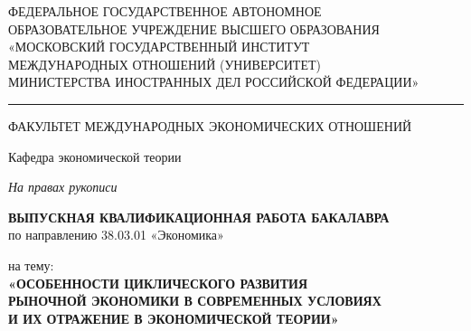 \thispagestyle{empty}


\vspace{0pt plus2fill} %
\begin{center}
	ФЕДЕРАЛЬНОЕ ГОСУДАРСТВЕННОЕ АВТОНОМНОЕ \\
    ОБРАЗОВАТЕЛЬНОЕ УЧРЕЖДЕНИЕ ВЫСШЕГО ОБРАЗОВАНИЯ \\
    «МОСКОВСКИЙ ГОСУДАРСТВЕННЫЙ ИНСТИТУТ \\
    МЕЖДУНАРОДНЫХ ОТНОШЕНИЙ (УНИВЕРСИТЕТ) \\
    МИНИСТЕРСТВА ИНОСТРАННЫХ ДЕЛ РОССИЙСКОЙ ФЕДЕРАЦИИ»
\rule{\textwidth}{0.4pt}
\end{center}

\begin{center}
    ФАКУЛЬТЕТ МЕЖДУНАРОДНЫХ ЭКОНОМИЧЕСКИХ ОТНОШЕНИЙ
\end{center}

\begin{center}
    Кафедра экономической теории
\end{center}

\vspace{2pt} %

\begin{flushright}
   \itshape  На правах рукописи
\end{flushright}

\vspace{0pt plus2fill} %

\begin{center}
    \textbf{ВЫПУСКНАЯ КВАЛИФИКАЦИОННАЯ РАБОТА БАКАЛАВРА} \\
    по направлению 38.03.01 «Экономика»
\end{center}

\begin{center}
    на тему: \\
    \textbf{«ОСОБЕННОСТИ ЦИКЛИЧЕСКОГО РАЗВИТИЯ \\
    РЫНОЧНОЙ ЭКОНОМИКИ В СОВРЕМЕННЫХ УСЛОВИЯХ \\
    И ИХ ОТРАЖЕНИЕ В ЭКОНОМИЧЕСКОЙ ТЕОРИИ»}
\end{center}

\vspace{0pt plus2fill} %


